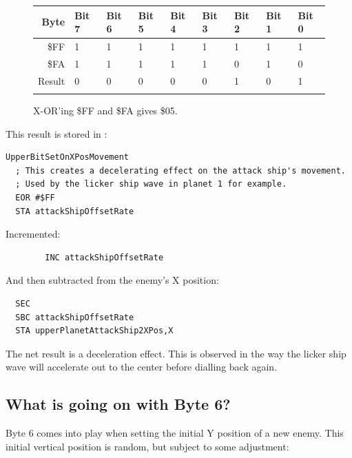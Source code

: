 \begin{figure}[H]
  {
    \setlength{\tabcolsep}{3.0pt}
    \setlength\cmidrulewidth{\heavyrulewidth} %
    \begin{adjustbox}{width=7cm,center}

      \begin{tabular}{rllllllll}
        \toprule
        Byte & Bit 7 & Bit 6 & Bit 5 & Bit 4 & Bit 3 & Bit 2 & Bit 1 & Bit 0        \\
        \midrule
        \$FF & 1 & 1 & 1 & 1 & 1 & 1 & 1 & 1 \\
        \$FA & 1 & 1 & 1 & 1 & 1 & 0 & 1 & 0 \\
        \midrule
        Result & 0 & 0 & 0 & 0 & 0 & 1 & 0 & 1 \\
        \addlinespace
        \bottomrule
      \end{tabular}

    \end{adjustbox}

    }\caption*{X-OR'ing \$FF and \$FA gives \$05.}
\end{figure}

This result is stored in :
\begin{lstlisting}
UpperBitSetOnXPosMovement   
  ; This creates a decelerating effect on the attack ship's movement.
  ; Used by the licker ship wave in planet 1 for example.
  EOR #$FF
  STA attackShipOffsetRate
\end{lstlisting}

Incremented:
\begin{lstlisting}
        INC attackShipOffsetRate
\end{lstlisting}

And then subtracted from the enemy's X position:
\begin{lstlisting}
  SEC
  SBC attackShipOffsetRate
  STA upperPlanetAttackShip2XPos,X
\end{lstlisting}

The net result is a deceleration effect. This is observed in the way the licker ship
wave will accelerate out to the center before dialling back again.


\subsection{What is going on with Byte 6?}

Byte 6 comes into play when setting the initial Y position of a new enemy. This initial vertical
position is random, but subject to some adjustment:

